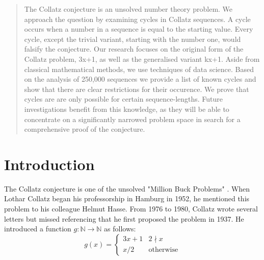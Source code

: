 \date{Received: date / Accepted: date}


\maketitle

\begin{abstract}
The Collatz conjecture is an unsolved number theory problem. We approach the question by examining cycles in Collatz sequences. A cycle occurs when a number in a sequence is equal to the starting value. Every cycle, except the trivial variant, starting with the number one, would falsify the conjecture. Our research focuses on the original form of the Collatz problem, 3x+1, as well as the generalised variant kx+1. Aside from classical mathematical methods, we use techniques of data science. Based on the analysis of 250,000 sequences we provide a list of known cycles and show that there are clear restrictions for their occurence. We prove that cycles are are only possible for certain sequence-lengths. Future investigations benefit from this knowledge, as they will be able to concentrate on a significantly narrowed problem space in search for a comprehensive proof of the conjecture.
\end{abstract}

\section{Introduction}
\label{intro}
The Collatz conjecture is one of the unsolved "Million Buck Problems" \cite{Ref_Williams_2000}. When Lothar Collatz began his professorship in Hamburg in 1952, he mentioned this problem to his colleague Helmut Hasse. From 1976 to 1980, Collatz wrote several letters but missed referencing that he first proposed the problem in 1937. He introduced a function $g:\mathbb{N}\rightarrow\mathbb{N}$ as follows:
\begin{equation}
\label{eq:func_collatz}
g(x)=
\begin{cases}
3x+1	&	2\nmid x\\
x/2		&	\text{otherwise}
\end{cases}
\end{equation}

